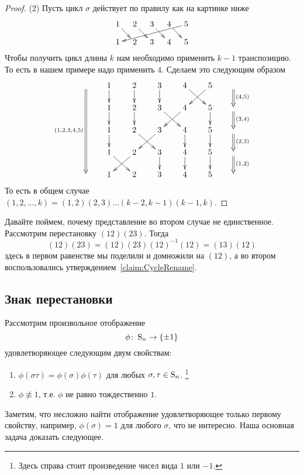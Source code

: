 \begin{proof}
(2) Пусть цикл $\sigma$ действует по правилу как на картинке ниже
\[
\xymatrix@R=10pt@C=10pt{
  {1}\ar[dr]&{2}\ar[dr]&{3}\ar[dr]&{4}\ar[dr]&{5}\ar[dllll]\\
  {1}&{2}&{3}&{4}&{5}\\
}
\]
Чтобы получить цикл длины $k$ нам необходимо применить $k-1$ транспозицию. 
То есть в нашем примере надо применить $4$.
Сделаем это следующим образом
\[
\xymatrix@R=15pt@C=20pt{
  {}\ar@{=>}_{(1,2,3,4,5)}[dddd]&{1}\ar[d]&{2}\ar[d]&{3}\ar[d]&{4}\ar[dr]&{5}\ar[dl]&{}\ar@{=>}[d]^{(4,5)}\\
  {}&{1}\ar[d]&{2}\ar[d]&{3}\ar[dr]&{4}\ar[dl]&{5}\ar[d]&{}\ar@{=>}[d]^{(3,4)}\\
  {}&{1}\ar[d]&{2}\ar[dr]&{3}\ar[dl]&{4}\ar[d]&{5}\ar[d]&{}\ar@{=>}[d]^{(2,3)}\\
  {}&{1}\ar[dr]&{2}\ar[dl]&{3}\ar[d]&{4}\ar[d]&{5}\ar[d]&{}\ar@{=>}[d]^{(1,2)}\\
  {}&{1}&{2}&{3}&{4}&{5}&{}\\
}
\]
То есть в общем случае $(1,2,\ldots,k) = (1,2)(2,3)\ldots(k-2,k-1)(k-1,k)$.

\end{proof}

Давайте поймем, почему представление во втором случае не единственное.
Рассмотрим перестановку $(12)(23)$.
Тогда
\[
(12)(23) = (12)(23)(12)^{-1}(12) = (13)(12)
\]
здесь в первом равенстве мы поделили и домножили на $(12)$, а во втором воспользовались утверждением~\ref{claim:CycleRename}.

\subsection{Знак перестановки}

Рассмотрим произвольное отображение 
\[
\phi\colon \operatorname{S}_{n}\to \{\pm 1\}
\]
удовлетворяющее следующим двум свойствам:
\begin{enumerate}
\item $\phi(\sigma \tau) = \phi(\sigma)\phi(\tau)$ для любых $\sigma, \tau \in\operatorname{S}_{n}$.%
\footnote{Здесь справа стоит произведение чисел вида $1$ или $-1$.}

\item $\phi\not\equiv 1$, т.е. $\phi$ не равно тождественно $1$.
\end{enumerate}
Заметим, что несложно найти отображение удовлетворяющее только первому свойству, например, $\phi(\sigma) = 1$ для любого $\sigma$, что не интересно.
Наша основная задача доказать следующее.

